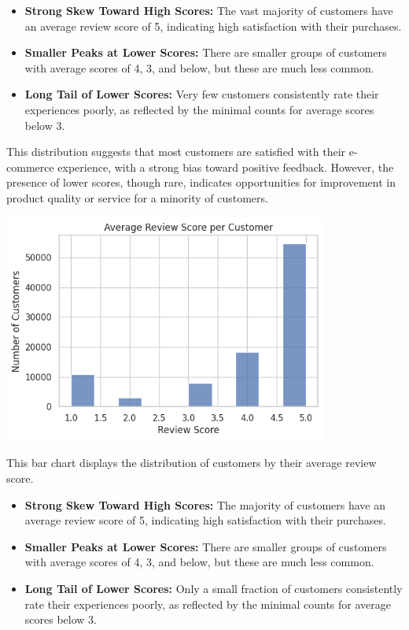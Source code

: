 \documentclass[a4paper]{article}
\begin{document}
\begin{multicols}{2}
    \begin{itemize}
        \item \textbf{Strong Skew Toward High Scores:} The vast majority of customers have an average review score of 5, indicating high satisfaction with their purchases.
        \item \textbf{Smaller Peaks at Lower Scores:} There are smaller groups of customers with average scores of 4, 3, and below, but these are much less common.
        \item \textbf{Long Tail of Lower Scores:} Very few customers consistently rate their experiences poorly, as reflected by the minimal counts for average scores below 3.
    \end{itemize}

    This distribution suggests that most customers are satisfied with their e-commerce experience, with a strong bias toward positive feedback. However, the presence of lower scores, though rare, indicates opportunities for improvement in product quality or service for a minority of customers.


\noindent
\begin{minipage}{\columnwidth}
\centering
\includegraphics[width=0.8\textwidth]{Average Review Score per Customer.png}
\label{fig:avg_review_score_per_customer} 
\end{minipage}

This bar chart displays the distribution of customers by their average review score.

\begin{itemize}
    \item \textbf{Strong Skew Toward High Scores:} The majority of customers have an average review score of 5, indicating high satisfaction with their purchases.
    \item \textbf{Smaller Peaks at Lower Scores:} There are smaller groups of customers with average scores of 4, 3, and below, but these are much less common.
    \item \textbf{Long Tail of Lower Scores:} Only a small fraction of customers consistently rate their experiences poorly, as reflected by the minimal counts for average scores below 3.
\end{itemize}


\end{multicols}
\end{document}
